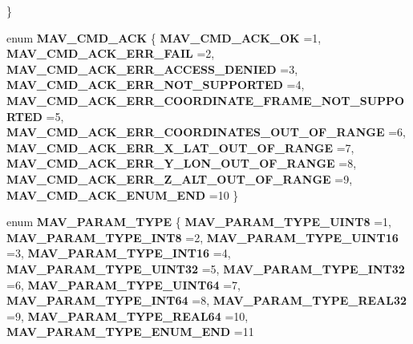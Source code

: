 \begin{DoxyCompactItemize}
 \}
\item 
enum \textbf{ M\+A\+V\+\_\+\+C\+M\+D\+\_\+\+A\+CK} \{ \newline
\textbf{ M\+A\+V\+\_\+\+C\+M\+D\+\_\+\+A\+C\+K\+\_\+\+OK} =1, 
\textbf{ M\+A\+V\+\_\+\+C\+M\+D\+\_\+\+A\+C\+K\+\_\+\+E\+R\+R\+\_\+\+F\+A\+IL} =2, 
\textbf{ M\+A\+V\+\_\+\+C\+M\+D\+\_\+\+A\+C\+K\+\_\+\+E\+R\+R\+\_\+\+A\+C\+C\+E\+S\+S\+\_\+\+D\+E\+N\+I\+ED} =3, 
\textbf{ M\+A\+V\+\_\+\+C\+M\+D\+\_\+\+A\+C\+K\+\_\+\+E\+R\+R\+\_\+\+N\+O\+T\+\_\+\+S\+U\+P\+P\+O\+R\+T\+ED} =4, 
\newline
\textbf{ M\+A\+V\+\_\+\+C\+M\+D\+\_\+\+A\+C\+K\+\_\+\+E\+R\+R\+\_\+\+C\+O\+O\+R\+D\+I\+N\+A\+T\+E\+\_\+\+F\+R\+A\+M\+E\+\_\+\+N\+O\+T\+\_\+\+S\+U\+P\+P\+O\+R\+T\+ED} =5, 
\textbf{ M\+A\+V\+\_\+\+C\+M\+D\+\_\+\+A\+C\+K\+\_\+\+E\+R\+R\+\_\+\+C\+O\+O\+R\+D\+I\+N\+A\+T\+E\+S\+\_\+\+O\+U\+T\+\_\+\+O\+F\+\_\+\+R\+A\+N\+GE} =6, 
\textbf{ M\+A\+V\+\_\+\+C\+M\+D\+\_\+\+A\+C\+K\+\_\+\+E\+R\+R\+\_\+\+X\+\_\+\+L\+A\+T\+\_\+\+O\+U\+T\+\_\+\+O\+F\+\_\+\+R\+A\+N\+GE} =7, 
\textbf{ M\+A\+V\+\_\+\+C\+M\+D\+\_\+\+A\+C\+K\+\_\+\+E\+R\+R\+\_\+\+Y\+\_\+\+L\+O\+N\+\_\+\+O\+U\+T\+\_\+\+O\+F\+\_\+\+R\+A\+N\+GE} =8, 
\newline
\textbf{ M\+A\+V\+\_\+\+C\+M\+D\+\_\+\+A\+C\+K\+\_\+\+E\+R\+R\+\_\+\+Z\+\_\+\+A\+L\+T\+\_\+\+O\+U\+T\+\_\+\+O\+F\+\_\+\+R\+A\+N\+GE} =9, 
\textbf{ M\+A\+V\+\_\+\+C\+M\+D\+\_\+\+A\+C\+K\+\_\+\+E\+N\+U\+M\+\_\+\+E\+ND} =10
 \}
\item 
enum \textbf{ M\+A\+V\+\_\+\+P\+A\+R\+A\+M\+\_\+\+T\+Y\+PE} \{ \newline
\textbf{ M\+A\+V\+\_\+\+P\+A\+R\+A\+M\+\_\+\+T\+Y\+P\+E\+\_\+\+U\+I\+N\+T8} =1, 
\textbf{ M\+A\+V\+\_\+\+P\+A\+R\+A\+M\+\_\+\+T\+Y\+P\+E\+\_\+\+I\+N\+T8} =2, 
\textbf{ M\+A\+V\+\_\+\+P\+A\+R\+A\+M\+\_\+\+T\+Y\+P\+E\+\_\+\+U\+I\+N\+T16} =3, 
\textbf{ M\+A\+V\+\_\+\+P\+A\+R\+A\+M\+\_\+\+T\+Y\+P\+E\+\_\+\+I\+N\+T16} =4, 
\newline
\textbf{ M\+A\+V\+\_\+\+P\+A\+R\+A\+M\+\_\+\+T\+Y\+P\+E\+\_\+\+U\+I\+N\+T32} =5, 
\textbf{ M\+A\+V\+\_\+\+P\+A\+R\+A\+M\+\_\+\+T\+Y\+P\+E\+\_\+\+I\+N\+T32} =6, 
\textbf{ M\+A\+V\+\_\+\+P\+A\+R\+A\+M\+\_\+\+T\+Y\+P\+E\+\_\+\+U\+I\+N\+T64} =7, 
\textbf{ M\+A\+V\+\_\+\+P\+A\+R\+A\+M\+\_\+\+T\+Y\+P\+E\+\_\+\+I\+N\+T64} =8, 
\newline
\textbf{ M\+A\+V\+\_\+\+P\+A\+R\+A\+M\+\_\+\+T\+Y\+P\+E\+\_\+\+R\+E\+A\+L32} =9, 
\textbf{ M\+A\+V\+\_\+\+P\+A\+R\+A\+M\+\_\+\+T\+Y\+P\+E\+\_\+\+R\+E\+A\+L64} =10, 
\textbf{ M\+A\+V\+\_\+\+P\+A\+R\+A\+M\+\_\+\+T\+Y\+P\+E\+\_\+\+E\+N\+U\+M\+\_\+\+E\+ND} =11

\end{DoxyCompactItemize}

